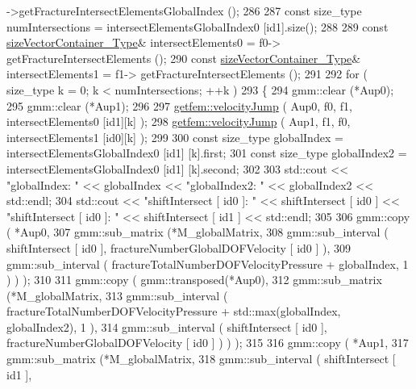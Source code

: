 \begin{DoxyCode}
      ->getFractureIntersectElementsGlobalIndex ();
286         
287         \textcolor{keyword}{const} size\_type numIntersections = intersectElementsGlobalIndex0 [id1].size();
288         
289         \textcolor{keyword}{const} \hyperlink{Core_8h_a80e8381d86ecb0a7f4f87ff84d1a0be5}{sizeVectorContainer\_Type}& intersectElements0 = f0->
      getFractureIntersectElements ();
290         \textcolor{keyword}{const} \hyperlink{Core_8h_a80e8381d86ecb0a7f4f87ff84d1a0be5}{sizeVectorContainer\_Type}& intersectElements1 = f1->
      getFractureIntersectElements ();
291         
292         \textcolor{keywordflow}{for} ( size\_type k = 0; k < numIntersections; ++k )
293         \{
294             gmm::clear (*Aup0);
295             gmm::clear (*Aup1);
296 
297             \hyperlink{namespacegetfem_ad30c51da96437cccb950494a83601842}{getfem::velocityJump} ( Aup0, f0, f1, intersectElements0 [id1][k] );
298             \hyperlink{namespacegetfem_ad30c51da96437cccb950494a83601842}{getfem::velocityJump} ( Aup1, f1, f0, intersectElements1 [id0][k] );
299 
300             \textcolor{keyword}{const} size\_type globalIndex = intersectElementsGlobalIndex0 [id1] [k].first;
301             \textcolor{keyword}{const} size\_type globalIndex2 = intersectElementsGlobalIndex0 [id1] [k].second;
302             
303             std::cout << \textcolor{stringliteral}{"globalIndex: "} << globalIndex << \textcolor{stringliteral}{"globalIndex2: "} << globalIndex2 << std::endl;
304             std::cout << \textcolor{stringliteral}{"shiftIntersect [ id0 ]: "} << shiftIntersect [ id0 ] << \textcolor{stringliteral}{"shiftIntersect [ id0 ]: "}
       << shiftIntersect [ id1 ] << std::endl;
305 
306             gmm::copy ( *Aup0, 
307                         gmm::sub\_matrix (*M\_globalMatrix,
308                                         gmm::sub\_interval ( shiftIntersect [ id0 ], 
      fractureNumberGlobalDOFVelocity [ id0 ] ),
309                                         gmm::sub\_interval (  fractureTotalNumberDOFVelocityPressure + 
      globalIndex, 1 ) ) );
310 
311             gmm::copy ( gmm::transposed(*Aup0), 
312                         gmm::sub\_matrix (*M\_globalMatrix,
313                                         gmm::sub\_interval (  fractureTotalNumberDOFVelocityPressure + 
      std::max(globalIndex, globalIndex2), 1 ),
314                                         gmm::sub\_interval ( shiftIntersect [ id0 ], 
      fractureNumberGlobalDOFVelocity [ id0 ] ) ) );
315 
316             gmm::copy ( *Aup1, 
317                         gmm::sub\_matrix (*M\_globalMatrix,
318                                         gmm::sub\_interval ( shiftIntersect [ id1 ], 

\end{DoxyCode}
